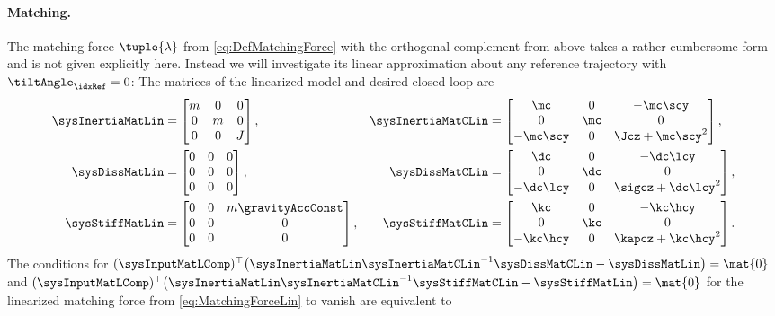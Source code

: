 \paragraph{Matching.}
The matching force $\tuple{\lambda}$ from \eqref{eq:DefMatchingForce} with the orthogonal complement from above takes a rather cumbersome form and is not given explicitly here.
Instead we will investigate its linear approximation about any reference trajectory with $\tiltAngle_\idxRef = 0$: The matrices of the linearized model and desired closed loop are
\begin{subequations}
\begin{align}
 \sysInertiaMatLin &= \begin{bmatrix} m & 0 & 0 \\ 0 & m & 0 \\ 0 & 0 & J \end{bmatrix},&
 \sysInertiaMatCLin &= \begin{bmatrix} \mc & 0 & -\mc\scy \\ 0 & \mc & 0 \\ -\mc\scy & 0 & \Jcz + \mc\scy^2 \end{bmatrix},
\\
 \sysDissMatLin &= \begin{bmatrix} 0 & 0 & 0 \\ 0 & 0 & 0 \\ 0 & 0 & 0 \end{bmatrix},&
 \sysDissMatCLin &= \begin{bmatrix} \dc & 0 & -\dc\lcy \\ 0 & \dc & 0 \\ -\dc\lcy & 0 & \sigcz + \dc\lcy^2 \end{bmatrix},
\\
 \sysStiffMatLin &= \begin{bmatrix} 0 & 0 & m \gravityAccConst \\ 0 & 0 & 0 \\ 0 & 0 & 0 \end{bmatrix},&
 \sysStiffMatCLin &= \begin{bmatrix} \kc & 0 & -\kc\hcy \\ 0 & \kc & 0 \\ -\kc\hcy & 0 & \kapcz + \kc\hcy^2 \end{bmatrix}.
\end{align}
\end{subequations}
The conditions for $(\sysInputMatLComp)^\top \big( \sysInertiaMatLin \sysInertiaMatCLin^{-1} \sysDissMatCLin - \sysDissMatLin\big) = \mat{0}$ and $(\sysInputMatLComp)^\top \big( \sysInertiaMatLin \sysInertiaMatCLin^{-1} \sysStiffMatCLin - \sysStiffMatLin\big) = \mat{0}$ for the linearized matching force from \eqref{eq:MatchingForceLin} to vanish are equivalent to
